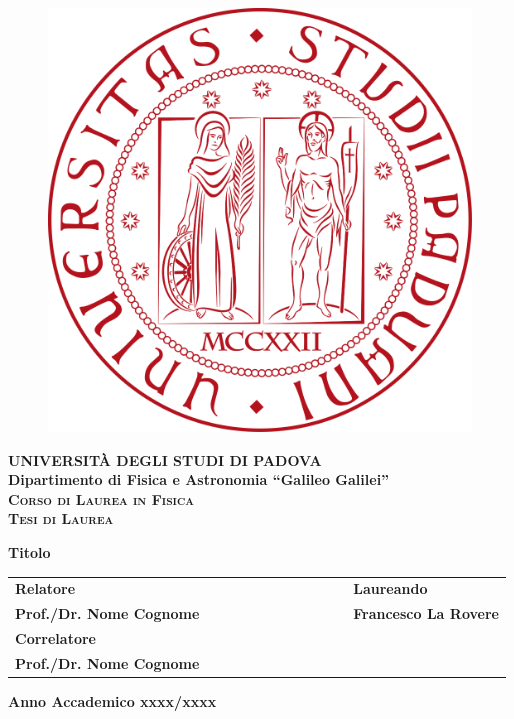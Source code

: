 \documentclass[a4paper,11pt]{book}
\begin{document}
\frontmatter
\begin{titlepage}
\vspace{5mm}
\begin{figure}[hbtp]
\centering
\includegraphics[scale=.13]{../Immagini/unipd_logo.png}
\end{figure}
\vspace{5mm}
\begin{center}
{{\huge{\textsc{\bf UNIVERSIT\`A DEGLI STUDI DI PADOVA}}}\\}
\vspace{5mm}
{\Large{\bf Dipartimento di Fisica e Astronomia ``Galileo Galilei''}} \\
\vspace{5mm}
{\Large{\textsc{\bf Corso di Laurea in Fisica}}}\\
\vspace{20mm}
{\Large{\textsc{\bf Tesi di Laurea}}}\\
\vspace{30mm}
\begin{spacing}{3}
{\LARGE \textbf{Titolo}}\\
\end{spacing}
\vspace{8mm}
\end{center}

\vspace{20mm}
\begin{spacing}{2}
\begin{tabular}{ l  c  c c c  cc c c c c  l }
{\Large{\bf Relatore}} &&&&&&&&&&& {\Large{\bf Laureando}}\\
{\Large{\bf Prof./Dr. Nome Cognome}} &&&&&&&&&&& {\Large{\bf Francesco La Rovere}}\\
{\Large{\bf Correlatore}}\\
{\Large{\bf Prof./Dr. Nome Cognome}}\\
\end{tabular}
\end{spacing}
\vspace{15 mm}

\begin{center}
{\Large{\bf Anno Accademico xxxx/xxxx}}
\end{center}
\end{titlepage}
\clearpage{\pagestyle{empty}\cleardoublepage}
\end{document}
